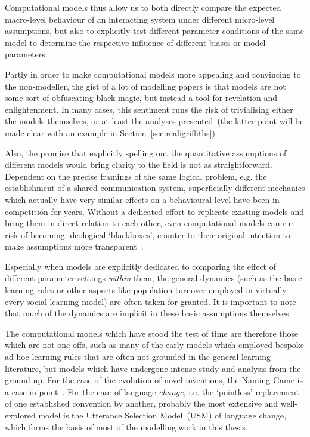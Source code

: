 Computational models thus allow us to both directly compare the expected macro-level behaviour of an interacting system under different micro-level assumptions, but also to explicitly test different parameter conditions of the same model to determine the respective influence of different biases or model parameters.

Partly in order to make computational models more appealing and convincing to the non-modeller, the gist of a lot of modelling papers is that models are not some sort of obfuscating black magic, but instead a tool for revelation and enlightenment.
In many cases, this sentiment runs the risk of trivialising either the models themselves, or at least the analyses presented~(the latter point will be made clear with an example in Section~\ref{sec:realigriffiths})


Also, the promise that explicitly spelling out the quantitative assumptions of different models would bring clarity to the field is not as straightforward. Dependent on the precise framings of the same logical problem, e.g. the establishment of a shared communication system, superficially different mechanics which actually have very similar effects on a behavioural level have been in competition for years. Without a dedicated effort to replicate existing models and bring them in direct relation to each other, even computational models can run risk of becoming ideological `blackboxes', counter to their original intention to make assumptions more transparent~\citep[see][for the exemplary case of proposed pressures]{Spike2016}.


Especially when models are explicitly dedicated to comparing the effect of different parameter settings \emph{within} them, the general dynamics (such as the basic learning rules or other aspects like population turnover employed in virtually every social learning model) are often taken for granted. It is important to note that much of the dynamics are implicit in these basic assumptions themselves. 

The computational models which have stood the test of time are therefore those which are not one-offs, such as many of the early models which employed bespoke ad-hoc learning rules that are often not grounded in the general learning literature, but models which have undergone intense study and analysis from the ground up. For the case of the evolution of novel inventions, the Naming Game is a case in point~\citep{Baronchelli2008}. For the case of language \emph{change}, i.e. the `pointless' replacement of one established convention by another, probably the most extensive and well-explored model is the Utterance Selection Model~(USM) of language change, which forms the basis of most of the modelling work in this thesis.

